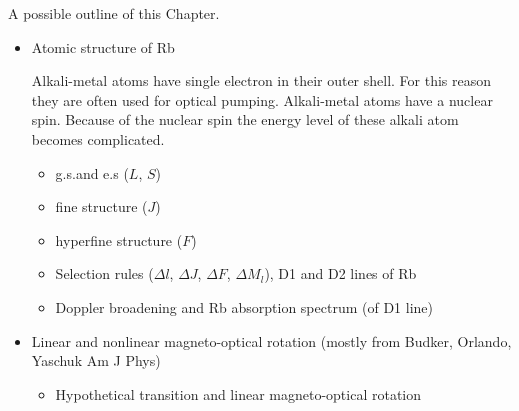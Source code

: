 A possible outline of this Chapter.
\begin{itemize}
\item Atomic structure of Rb

Alkali-metal atoms have single electron in their outer shell. For this reason they are often used for optical pumping. Alkali-metal atoms have a nuclear spin.
 Because of the nuclear spin the energy level of these alkali atom becomes complicated.
  \begin{itemize}
  \item g.s.and e.s ($L$, $S$)
  
  
  \item fine structure ($J$)
  
  \item hyperfine structure ($F$)
  
  
  \item Selection rules ($\Delta l$, $\Delta J$, $\Delta F$, $\Delta
    M_l$), D1 and D2 lines of Rb
    
  
  \item Doppler broadening and Rb absorption spectrum (of D1 line)
  \end{itemize}
\item Linear and nonlinear magneto-optical rotation (mostly from
  Budker, Orlando, Yaschuk Am J Phys)
  \begin{itemize}
  \item Hypothetical transition and linear magneto-optical rotation
  

\end{itemize}
\end{itemize}
